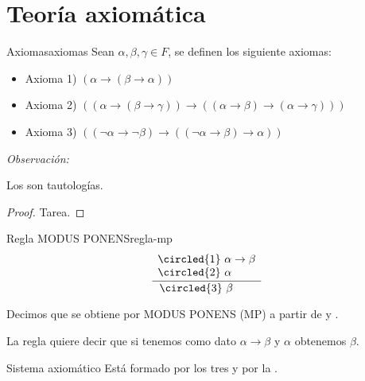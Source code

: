 \pagebreak
\section{Teoría axiomática}\label{sec:teoria-axiomatica}

\begin{definicion}{Axiomas}{axiomas}
    Sean $\alpha, \beta, \gamma \in F$, se definen los siguiente axiomas:

    \medskip

    \begin{itemize}
        \item Axioma 1) $(\alpha \to (\beta \to \alpha))$
        \item Axioma 2) $((\alpha \to (\beta\to\gamma )) \to 
            ((\alpha\to\beta) \to (\alpha \to \gamma)))$
        \item Axioma 3) $((\neg \alpha \to \neg\beta) \to 
            ((\neg \alpha \to \beta) \to \alpha))$
    \end{itemize}
\end{definicion}

\bigskip
\textit{Observación:}

Los  son tautologías.

\begin{proof} \phantom{.}
    Tarea.
\end{proof}


\begin{definicion}{Regla MODUS PONENS}{regla-mp}
    \begin{equation*}
    \frac{
        \begin{array}[b]{l}
            \circled{1} ~ \alpha \to \beta \\
            \circled{2} ~ \alpha
        \end{array}
    }{
            \circled{3} ~ \beta \phantom{\to \beta}
    }
    \end{equation*}

    \medskip

    Decimos que  se obtiene por MODUS PONENS (MP) a partir
    de  y .
\end{definicion}

La regla quiere decir que si tenemos como dato $\alpha\to\beta$ y 
$\alpha$ obtenemos $\beta$.

\medskip

\begin{definicion}{Sistema axiomático}{}
    Está formado por los tres  y por la
    .
\end{definicion}



